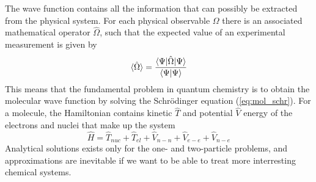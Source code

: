 The wave function contains all the information that can possibly be extracted from the 
physical system. For each physical observable $\Omega$ there is an associated mathematical 
operator $\hat{\Omega}$, such that the expected value of an experimental measurement is given by
\begin{equation}
    \langle \hat{\Omega}\rangle = \frac{\langle\Psi|\hat{\Omega}|\Psi\rangle}
    {\langle\Psi|\Psi\rangle}
\end{equation}
This means that the fundamental problem in quantum chemistry is to obtain the molecular
wave function by solving the Schr\"{o}dinger equation (\ref{eq:mol_schr}). For a molecule,
the Hamiltonian contains kinetic $\hat{T}$ and potential $\hat{V}$ energy of the 
electrons and nuclei that make up the system
\begin{equation}
    \hat{H} = \hat{T}_{nuc} + \hat{T}_{el} + \hat{V}_{n-n} + \hat{V}_{e-e} + \hat{V}_{n-e}
\end{equation}
Analytical solutions exists only for the one- and two-particle problems, and approximations are
inevitable if we want to be able to treat more interresting chemical systems. 

